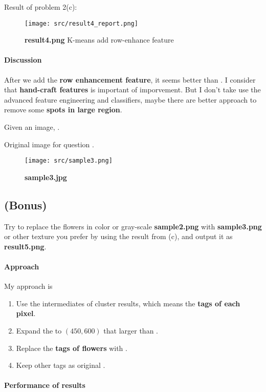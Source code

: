 Result of problem 2(c): 
\begin{figure}
    \centering
    \texttt{[image: src/result4\_report.png]}
    \caption{\textbf{result4.png} K-means add row-enhance feature}
    \label{result4}
\end{figure}

\paragraph{Discussion}
After we add the \textbf{row enhancement feature}, it seems better than .
I consider that \textbf{hand-craft features} is important of imporvement.
But I don't take use the advanced feature engineering and classifiers, maybe there are better approach to remove some \textbf{spots in large region}.

Given an image, .

Original image  for question .
\begin{figure}
    \centering
    \texttt{[image: src/sample3.png]}
    \caption{\textbf{sample3.jpg}}
    \label{sample3}
\end{figure}


\subsection{(Bonus)}\label{2_bonus}
Try to replace the flowers in color or gray-scale \textbf{sample2.png} with \textbf{sample3.png} or other texture you prefer by using the result from (c), and output it as \textbf{result5.png}.

\paragraph{Approach}
My approach is
\begin{enumerate}
    \item Use the intermediates of cluster results, which means the \textbf{tags of each pixel}.
    \item Expand the  to \((450, 600)\) that larger than .
    \item Replace the \textbf{tags of flowers} with .
    \item Keep other tags as original .
\end{enumerate}

\paragraph{Performance of results}

